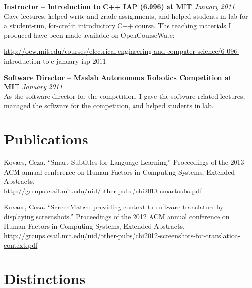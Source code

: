 \documentclass[margin,line]{resume}
\begin{document}
\begin{resume}
\textbf{Instructor -- Introduction to C++ IAP (6.096) at MIT} \hfill \textsl{January 2011}\\
Gave lectures, helped write and grade assignments, and helped students in lab for a student-run, for-credit introductory C++ course. The teaching materials I produced have been made available on OpenCourseWare:

\vspace{-4mm}

\url{http://ocw.mit.edu/courses/electrical-engineering-and-computer-science/6-096-introduction-to-c-january-iap-2011} \\

\vspace{-5mm}

\textbf{Software Director -- Maslab Autonomous Robotics Competition at MIT} \hfill \textsl{January 2011}\\
As the software director for the competition, I gave the software-related lectures,
managed the software for the competition, and helped students in lab.



\section{\mysidestyle Publications}

Kovacs, Geza. ``Smart Subtitles for Language Learning.'' Proceedings of the 2013 ACM annual conference on Human Factors in Computing Systems, Extended Abstracts.\\
\url{http://groups.csail.mit.edu/uid/other-pubs/chi2013-smartsubs.pdf}

Kovacs, Geza. ``ScreenMatch: providing context to software translators by displaying screenshots.'' Proceedings of the 2012 ACM annual conference on Human Factors in Computing Systems, Extended Abstracts.\\
\url{http://groups.csail.mit.edu/uid/other-pubs/chi2012-screenshots-for-translation-context.pdf}

\section{\mysidestyle Distinctions}


\end{resume}
\end{document}
